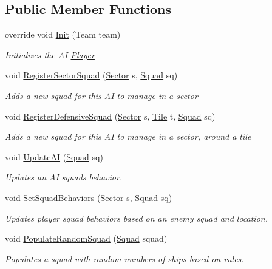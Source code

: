 \subsection*{Public Member Functions}
\begin{DoxyCompactItemize}
\item 
override void \hyperlink{class_a_i_player_af0321d8f60d724c9b0a69ed9e5766911}{Init} (Team team)
\begin{DoxyCompactList}\small\item\em Initializes the A\+I \hyperlink{class_player}{Player} \end{DoxyCompactList}\item 
void \hyperlink{class_a_i_player_ac41ba1e00aee19f7880b2029cb0f8e2b}{Register\+Sector\+Squad} (\hyperlink{class_sector}{Sector} s, \hyperlink{class_squad}{Squad} sq)
\begin{DoxyCompactList}\small\item\em Adds a new squad for this A\+I to manage in a sector \end{DoxyCompactList}\item 
void \hyperlink{class_a_i_player_a5d72fbdbf9aa234aaabdd3d8c6a61fa3}{Register\+Defensive\+Squad} (\hyperlink{class_sector}{Sector} s, \hyperlink{class_tile}{Tile} t, \hyperlink{class_squad}{Squad} sq)
\begin{DoxyCompactList}\small\item\em Adds a new squad for this A\+I to manage in a sector, around a tile \end{DoxyCompactList}\item 
void \hyperlink{class_a_i_player_a56da84216f2f5aa6b98771e95d7a6978}{Update\+A\+I} (\hyperlink{class_squad}{Squad} sq)
\begin{DoxyCompactList}\small\item\em Updates an A\+I squad\textquotesingle{}s behavior. \end{DoxyCompactList}\item 
void \hyperlink{class_a_i_player_a082991cdc32c36771aefef8c288db3d1}{Set\+Squad\+Behaviors} (\hyperlink{class_sector}{Sector} s, \hyperlink{class_squad}{Squad} sq)
\begin{DoxyCompactList}\small\item\em Updates player squad behaviors based on an enemy squad and location. \end{DoxyCompactList}\item 
void \hyperlink{class_a_i_player_a538d8fb30dab69870c53bfbbf9775e7c}{Populate\+Random\+Squad} (\hyperlink{class_squad}{Squad} squad)
\begin{DoxyCompactList}\small\item\em Populates a squad with random numbers of ships based on rules. \end{DoxyCompactList}\end{DoxyCompactItemize}
